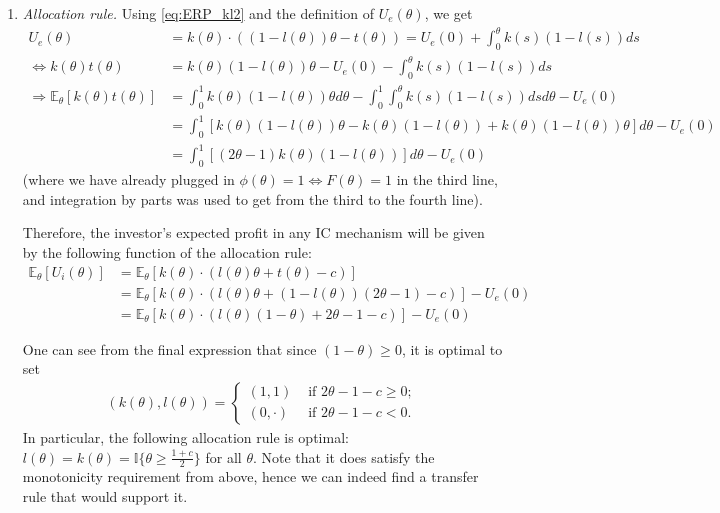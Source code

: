 \documentclass[a4paper]{article}
\begin{document}
\begin{enumerate}
		\item \emph{Allocation rule.} Using \eqref{eq:ERP_kl2} and the definition of $U_e(\theta)$, we get
		\begin{align*}
			U_e(\theta) &= k(\theta) \cdot \left( (1-l(\theta)) \theta - t(\theta) \right) = U_e(0) + \int_0^\theta k(s) (1-l(s)) ds
			\\
			\Leftrightarrow
			k(\theta) t(\theta) &= k(\theta) (1-l(\theta)) \theta - U_e(0) - \int_0^\theta k(s) (1-l(s)) ds
			\\
			\Rightarrow
			\mathbb{E}_\theta [k(\theta) t(\theta)] &= \int_0^1 k(\theta) (1-l(\theta)) \theta d\theta - \int_0^1 \int_0^\theta k(s) (1-l(s)) ds d\theta - U_e(0)
			\\
			&= \int_0^1 \left[ k(\theta) (1-l(\theta)) \theta - k(\theta) (1-l(\theta)) + k(\theta) (1-l(\theta)) \theta \right] d\theta - U_e(0)
			\\
			&= \int_0^1 \left[ (2\theta -1) k(\theta) (1-l(\theta)) \right] d\theta - U_e(0)
		\end{align*}
		(where we have already plugged in $\phi(\theta)=1\Leftrightarrow F(\theta)=1$ in the third line, and integration by parts was used to get from the third to the fourth line).
		
		Therefore, the investor's expected profit in any IC mechanism will be given by the following function of the allocation rule:
		\begin{align*}
			\mathbb{E}_\theta[U_i(\theta)] &= \mathbb{E}_\theta \left[ k(\theta) \cdot (l(\theta) \theta + t(\theta) - c) \right] 
			\\
			&= \mathbb{E}_\theta \left[ k(\theta) \cdot (l(\theta) \theta + (1-l(\theta))(2\theta-1) - c) \right] -U_e(0)
			\\
			&= \mathbb{E}_\theta \left[ k(\theta) \cdot (l(\theta) (1-\theta) + 2\theta-1 - c) \right] -U_e(0)
		\end{align*}
		
		One can see from the final expression that since $(1-\theta) \geq 0$, it is optimal to set
		\begin{align*}
			(k(\theta),l(\theta)) =
			\begin{cases}
				(1,1) & \text{ if } 2\theta -1 -c \geq 0;
				\\
				(0,\cdot) & \text{ if } 2\theta -1 -c < 0.
			\end{cases}
		\end{align*}
		In particular, the following allocation rule is optimal: $l(\theta) = k(\theta) = \mathbb{I}\{ \theta \geq \frac{1+c}{2} \}$ for all $\theta$. Note that it does satisfy the monotonicity requirement from above, hence we can indeed find a transfer rule that would support it.
		

\end{enumerate}
\end{document}
